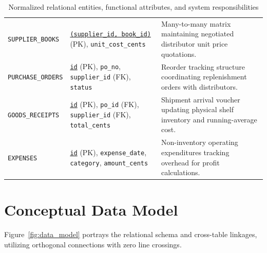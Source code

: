 \documentclass[12pt, a4paper]{report}
\begin{document}
\begin{table}[H]
\begin{tabularx}{\textwidth}{L{3.2cm} L{5.8cm} L{6.2cm}}
\texttt{SUPPLIER\_BOOKS} & \underline{\texttt{(supplier\_id, book\_id)}} (PK), \texttt{unit\_cost\_cents} & Many-to-many matrix maintaining negotiated distributor unit price quotations. \\
\texttt{PURCHASE\_ORDERS}& \underline{\texttt{id}} (PK), \texttt{po\_no}, \texttt{supplier\_id} (FK), \texttt{status} & Reorder tracking structure coordinating replenishment orders with distributors. \\
\texttt{GOODS\_RECEIPTS} & \underline{\texttt{id}} (PK), \texttt{po\_id} (FK), \texttt{supplier\_id} (FK), \texttt{total\_cents} & Shipment arrival voucher updating physical shelf inventory and running-average cost. \\
\texttt{EXPENSES} & \underline{\texttt{id}} (PK), \texttt{expense\_date}, \texttt{category}, \texttt{amount\_cents} & Non-inventory operating expenditures tracking overhead for profit calculations. \\
\bottomrule
\end{tabularx}
\caption{Normalized relational entities, functional attributes, and system responsibilities}
\label{tab:entities}
\end{table}

\section{Conceptual Data Model}
Figure~\ref{fig:data_model} portrays the relational schema and cross-table linkages, utilizing orthogonal connections with zero line crossings.
\end{document}
